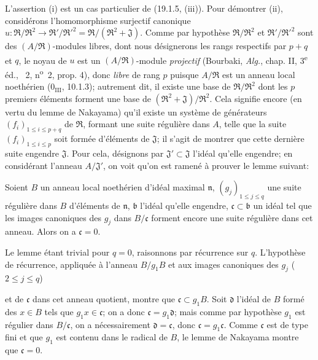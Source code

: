 L'assertion (i) est un cas particulier de (19.1.5, (iii)). Pour démontrer (ii), considérons l'homomorphisme surjectif canonique $u:\mathfrak R/\mathfrak R^2\to\mathfrak R'/\mathfrak R'^2=\mathfrak R/(\mathfrak R^2+\mathfrak J)$. Comme par hypothèse $\mathfrak R/\mathfrak R^2$ et $\mathfrak R'/\mathfrak R'^2$ sont des $(A/\mathfrak R)$-modules libres, dont nous désignerons les rangs respectifs par $p+q$ et $q$, le noyau de $u$ est un $(A/\mathfrak R)$-module \emph{projectif} (Bourbaki, \emph{Alg.}, chap. II, 3\textsuperscript{e} éd., \textsection~2, n\textsuperscript{o}~2, prop. 4), donc \emph{libre} de rang $p$ puisque $A/\mathfrak R$ est un anneau local noethérien ($0_{\mathrm{III}}$, 10.1.3); autrement dit, il existe une base de $\mathfrak R/\mathfrak R^2$ dont les $p$ premiers éléments forment une base de $(\mathfrak R^2+\mathfrak J)/\mathfrak R^2$. Cela signifie encore (en vertu du lemme de Nakayama) qu'il existe un système de générateurs $(f_i)_{1\leq i\leq p+q}$ de $\mathfrak R$, formant une suite régulière dans $A$, telle que la suite $(f_i)_{1\leq i\leq p}$ soit formée d'éléments de $\mathfrak J$; il s'agit de montrer que cette dernière suite engendre $\mathfrak J$. Pour cela, désignons par $\mathfrak J'\subset\mathfrak J$ l'idéal qu'elle engendre; en considérant l'anneau $A/\mathfrak J'$, on voit qu'on est ramené à prouver le lemme suivant:

\begin{lemma}[19.1.6.1]
\label{IV.19.1.6.1}
Soient $B$ un anneau local noethérien d'idéal maximal $\mathfrak n$, $(g_j)_{1\leq j\leq q}$ une suite régulière dans $B$ d'éléments de $\mathfrak n$, $\mathfrak b$ l'idéal qu'elle engendre, $\mathfrak c\subset\mathfrak b$ un idéal tel que les images canoniques des $g_j$ dans $B/\mathfrak c$ forment encore une suite régulière dans cet anneau. Alors on a $\mathfrak c=0$.
\end{lemma}

Le lemme étant trivial pour $q=0$, raisonnons par récurrence sur $q$. L'hypothèse de récurrence, appliquée à l'anneau $B/g_1B$ et aux images canoniques des $g_j$ ($2\leq j\leq q$)


et de $\mathfrak c$ dans cet anneau quotient, montre que $\mathfrak c\subset g_1B$. Soit $\mathfrak d$ l'idéal de $B$ formé des $x\in B$ tels que $g_1x\in\mathfrak c$; on a donc $\mathfrak c=g_1\mathfrak d$; mais comme par hypothèse $g_1$ est régulier dans $B/\mathfrak c$, on a nécessairement $\mathfrak d=\mathfrak c$, donc $\mathfrak c=g_1\mathfrak c$. Comme $\mathfrak c$ est de type fini et que $g_1$ est contenu dans le radical de $B$, le lemme de Nakayama montre que $\mathfrak c=0$.

